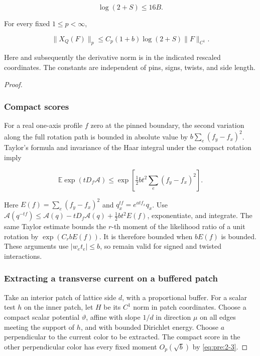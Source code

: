 \begin{equation}
\log(2+S)\leq16B.
\label{eq:pre:2-1}
\end{equation}

\begin{lemma}\label{pre:current-moments}
For every fixed \(1\leq p<\infty\),

\begin{equation}
\|X_Q(F)\|_p\leq C_p(1+b)\log(2+S)\|F\|_{C^1}.
\label{eq:pre:2-2}
\end{equation}

Here and subsequently the derivative norm is in the indicated rescaled coordinates. The constants are independent of pins, signs, twists, and side length.
\end{lemma}

\begin{proof}

\subsubsection{Compact scores}\label{pre:part-2-1}

For a real one-axis profile \(f\) zero at the pinned boundary, the second variation along the full rotation path is bounded in absolute value by
\(b\sum_e(f_y-f_x)^2\). Taylor's formula and invariance of the Haar integral under the compact rotation imply

\begin{equation}
\mathbb E\exp(tD_f\mathcal A)
\leq\exp\left[\tfrac12 b t^2\sum_e(f_y-f_x)^2\right].
\label{eq:pre:2-3}
\end{equation}

Here \(E(f)=\sum_e(f_y-f_x)^2\) and \(q^{tf}_x=e^{atf_x}q_x\).
Use \(\mathcal A(q^{-tf})\leq\mathcal A(q)-tD_f\mathcal A(q)+\frac12bt^2E(f)\), exponentiate, and integrate. The same Taylor estimate bounds the \(r\)-th moment of the likelihood ratio of a unit rotation by \(\exp(C_r bE(f))\). It is therefore bounded when \(bE(f)\) is bounded. These arguments use \(|w_et_e|\leq b\), so remain valid for signed and twisted interactions.

\subsubsection{Extracting a transverse current on a buffered patch}\label{pre:part-2-2}

Take an interior patch of lattice side \(d\), with a proportional buffer. For a scalar test \(h\) on the inner patch, let \(H\) be its \(C^1\) norm in patch coordinates. Choose a compact scalar potential \(\vartheta\), affine with slope \(1/d\) in direction \(\mu\) on all edges meeting the support of \(h\), and with bounded Dirichlet energy. Choose \(a\) perpendicular to the current color to be extracted. The compact score in the other perpendicular color has every fixed moment \(O_p(\sqrt b)\) by \eqref{eq:pre:2-3}.


\end{proof}
